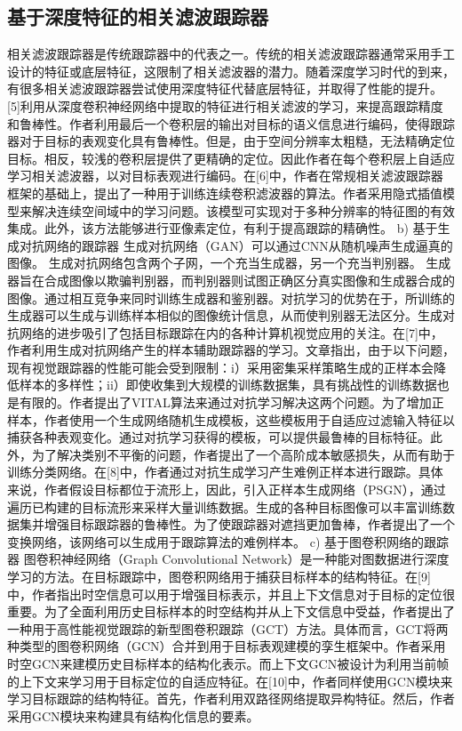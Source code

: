 \subsection{基于深度特征的相关滤波跟踪器}
相关滤波跟踪器是传统跟踪器中的代表之一。传统的相关滤波跟踪器通常采用手工设计的特征或底层特征，这限制了相关滤波器的潜力。随着深度学习时代的到来，有很多相关滤波跟踪器尝试使用深度特征代替底层特征，并取得了性能的提升。[5]利用从深度卷积神经网络中提取的特征进行相关滤波的学习，来提高跟踪精度和鲁棒性。作者利用最后一个卷积层的输出对目标的语义信息进行编码，使得跟踪器对于目标的表观变化具有鲁棒性。但是，由于空间分辨率太粗糙，无法精确定位目标。相反，较浅的卷积层提供了更精确的定位。因此作者在每个卷积层上自适应学习相关滤波器，以对目标表观进行编码。在[6]中，作者在常规相关滤波跟踪器框架的基础上，提出了一种用于训练连续卷积滤波器的算法。作者采用隐式插值模型来解决连续空间域中的学习问题。该模型可实现对于多种分辨率的特征图的有效集成。此外，该方法能够进行亚像素定位，有利于提高跟踪的精确性。
b)	基于生成对抗网络的跟踪器
生成对抗网络（GAN）可以通过CNN从随机噪声生成逼真的图像。 生成对抗网络包含两个子网，一个充当生成器，另一个充当判别器。 生成器旨在合成图像以欺骗判别器，而判别器则试图正确区分真实图像和生成器合成的图像。通过相互竞争来同时训练生成器和鉴别器。对抗学习的优势在于，所训练的生成器可以生成与训练样本相似的图像统计信息，从而使判别器无法区分。生成对抗网络的进步吸引了包括目标跟踪在内的各种计算机视觉应用的关注。在[7]中，作者利用生成对抗网络产生的样本辅助跟踪器的学习。文章指出，由于以下问题，现有视觉跟踪器的性能可能会受到限制：i）采用密集采样策略生成的正样本会降低样本的多样性；ii）即使收集到大规模的训练数据集，具有挑战性的训练数据也是有限的。作者提出了VITAL算法来通过对抗学习解决这两个问题。为了增加正样本，作者使用一个生成网络随机生成模板，这些模板用于自适应过滤输入特征以捕获各种表观变化。通过对抗学习获得的模板，可以提供最鲁棒的目标特征。此外，为了解决类别不平衡的问题，作者提出了一个高阶成本敏感损失，从而有助于训练分类网络。在[8]中，作者通过对抗生成学习产生难例正样本进行跟踪。具体来说，作者假设目标都位于流形上，因此，引入正样本生成网络（PSGN），通过遍历已构建的目标流形来采样大量训练数据。生成的各种目标图像可以丰富训练数据集并增强目标跟踪器的鲁棒性。为了使跟踪器对遮挡更加鲁棒，作者提出了一个变换网络，该网络可以生成用于跟踪算法的难例样本。
c)	基于图卷积网络的跟踪器
图卷积神经网络（Graph Convolutional Network）是一种能对图数据进行深度学习的方法。在目标跟踪中，图卷积网络用于捕获目标样本的结构特征。在[9]中，作者指出时空信息可以用于增强目标表示，并且上下文信息对于目标的定位很重要。为了全面利用历史目标样本的时空结构并从上下文信息中受益，作者提出了一种用于高性能视觉跟踪的新型图卷积跟踪（GCT）方法。具体而言，GCT将两种类型的图卷积网络（GCN）合并到用于目标表观建模的孪生框架中。作者采用时空GCN来建模历史目标样本的结构化表示。而上下文GCN被设计为利用当前帧的上下文来学习用于目标定位的自适应特征。在[10]中，作者同样使用GCN模块来学习目标跟踪的结构特征。首先，作者利用双路径网络提取异构特征。然后，作者采用GCN模块来构建具有结构化信息的要素。
